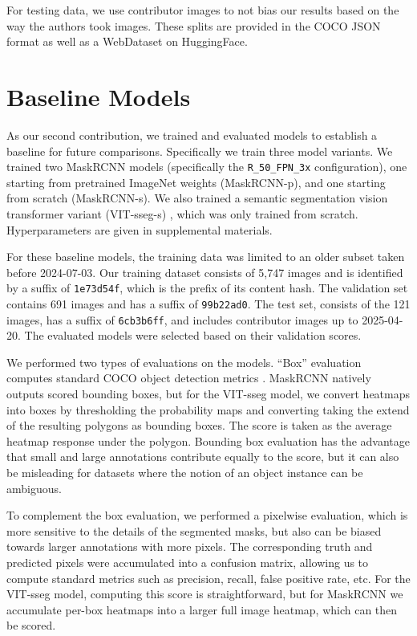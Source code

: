 \documentclass{article}
\begin{document}
For testing data, we use contributor images to not bias our results based on the way the authors took
  images.
These splits are provided in the COCO JSON format \cite{lin_microsoft_2014} as well as a WebDataset
  \cite{huggingfacewebdataset} on HuggingFace.

\section{Baseline Models}
\label{sec:models}

As our second contribution, we trained and evaluated models to establish a baseline for future comparisons.
Specifically we train three model variants.
We trained two MaskRCNN \cite{he2017mask} models (specifically the \texttt{R\_50\_FPN\_3x} configuration),
  one starting from pretrained ImageNet weights (MaskRCNN-p), and one starting from scratch
  (MaskRCNN-s).
We also trained a semantic segmentation vision transformer variant (VIT-sseg-s)
  \cite{Greenwell_2024_WACV,crall_geowatch_2024}, which was only trained from scratch.
Hyperparameters are given in supplemental materials.

For these baseline models, the training data was limited to an older subset taken before 2024-07-03.
Our training dataset consists of 5,747 images and is identified by a suffix of {\tt 1e73d54f}, which is the
  prefix of its content hash.
The validation set contains 691 images and has a suffix of {\tt 99b22ad0}.
The test set, consists of the 121 images, has a suffix of {\tt 6cb3b6ff}, and includes contributor images
  up to 2025-04-20.
The evaluated models were selected based on their validation scores.

We performed two types of evaluations on the models.
``Box'' evaluation computes standard COCO object detection metrics \cite{lin_microsoft_2014}.
MaskRCNN natively outputs scored bounding boxes, but for the VIT-sseg model, we convert heatmaps into boxes
  by thresholding the probability maps and converting taking the extend of the resulting polygons as bounding
  boxes.
The score is taken as the average heatmap response under the polygon.
Bounding box evaluation has the advantage that small and large annotations contribute equally to the score,
  but it can also be misleading for datasets where the notion of an object instance can be ambiguous.

To complement the box evaluation, we performed a pixelwise evaluation, which is more sensitive to the
  details of the segmented masks, but also can be biased towards larger annotations with more pixels.
The corresponding truth and predicted pixels were accumulated into a confusion matrix, allowing us to
  compute standard metrics \cite{powers_evaluation_2011} such as precision, recall, false positive rate, etc.
For the VIT-sseg model, computing this score is straightforward, but for MaskRCNN we accumulate per-box
  heatmaps into a larger full image heatmap, which can then be scored.
\end{document}

